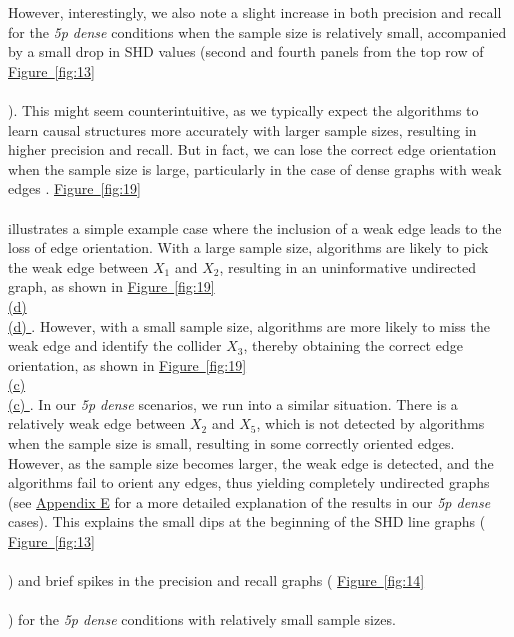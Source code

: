 \documentclass[twoside, 11pt]{article}
\newcommand*{\figref}[2][]{%
  \hyperref[{fig:#2}]{%
    Figure~\ref*{fig:#2}%
    \ifx\\#1\\%
    \else
      #1%
    \fi
  }%
}
\begin{document}
However, interestingly, we also note a slight increase in both precision and recall for the \textit{5p dense} conditions when the sample size is relatively small, accompanied by a small drop in SHD values (second and fourth panels from the top row of \figref[]{13}). This might seem counterintuitive, as we typically expect the algorithms to learn causal structures more accurately with larger sample sizes, resulting in higher precision and recall. But in fact, we can lose the correct edge orientation when the sample size is large, particularly in the case of dense graphs with weak edges \citep{eigenmann_structure_2017}. \figref[]{19} illustrates a simple example case where the inclusion of a weak edge leads to the loss of edge orientation. With a large sample size, algorithms are likely to pick the weak edge between $X_1$ and $X_2$, resulting in an uninformative undirected graph, as shown in \figref[(d)]{19}. However, with a small sample size, algorithms are more likely to miss the weak edge and identify the collider $X_3$, thereby obtaining the correct edge orientation, as shown in \figref[(c)]{19}. In our \textit{5p dense} scenarios, we run into a similar situation. There is a relatively weak edge between $X_2$ and $X_5$, which is not detected by algorithms when the sample size is small, resulting in some correctly oriented edges. However, as the sample size becomes larger, the weak edge is detected, and the algorithms fail to orient any edges, thus yielding completely undirected graphs (see \hyperref[5pdenseexam]{Appendix E} for a more detailed explanation of the results in our \textit{5p dense} cases). This explains the small dips at the beginning of the SHD line graphs (\figref[]{13}) and brief spikes in the precision and recall graphs (\figref[]{14}) for the \textit{5p dense} conditions with relatively small sample sizes.



\end{document}
